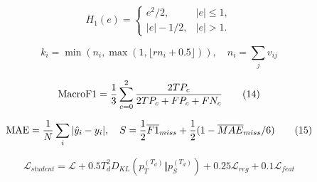 \begin{equation}
H_1(e)=\begin{cases}e^2/2,&|e|\le1,\\|e|-1/2,&|e|>1.\end{cases}\tag{12}
\end{equation}

\begin{equation}
k_i=\min(n_i,\max(1,\lfloor r n_i+0.5\rfloor)),\quad n_i=\sum_jv_{ij}\tag{13}
\end{equation}

\begin{equation}
\operatorname{MacroF1}={1\over3}\sum_{c=0}^2{2TP_c\over2TP_c+FP_c+FN_c}\tag{14}
\end{equation}

\begin{equation}
\operatorname{MAE}={1\over N}\sum_i|\hat y_i-y_i|,\quad S={1\over2}\overline{F1}_{miss}+{1\over2}(1-\overline{MAE}_{miss}/6)\tag{15}
\end{equation}

\begin{equation}
\mathcal L_{student}=\mathcal L+0.5T_d^2D_{KL}(p_T^{(T_d)}\Vert p_S^{(T_d)})+0.25\mathcal L_{reg}+0.1\mathcal L_{feat}\tag{16}
\end{equation}